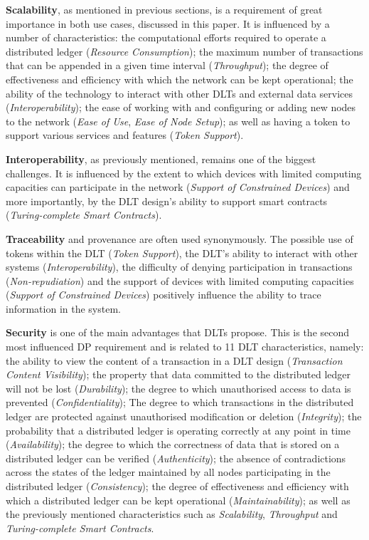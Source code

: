\textbf{Scalability}, as mentioned in previous sections, is a requirement of great importance in both use cases, discussed in this paper. It is influenced by a number of characteristics: the computational efforts required to operate a distributed ledger (\textit{Resource Consumption}); the maximum number of transactions that can be appended in a given time interval (\textit{Throughput}); the degree of effectiveness and efficiency with which the network can be kept operational; the ability of the technology to interact with other DLTs and external data services (\textit{Interoperability}); the ease of working with and configuring or adding new nodes to the network (\textit{Ease of Use}, \textit{Ease of Node Setup}); as well as having a token to support various services and features (\textit{Token Support}).

\textbf{Interoperability}, as previously mentioned, remains one of the biggest challenges. It is influenced by the extent to which devices with limited computing capacities can participate in the network (\textit{Support of Constrained Devices}) and more importantly, by the DLT design's ability to support smart contracts (\textit{Turing-complete Smart Contracts}).

\textbf{Traceability} and provenance are often used synonymously. The possible use of tokens within the DLT (\textit{Token Support}), the DLT's ability to interact with other systems (\textit{Interoperability}), the difficulty of denying participation in transactions (\textit{Non-repudiation}) and the support of devices with limited computing capacities (\textit{Support of Constrained Devices}) positively influence the ability to trace information in the system.

\textbf{Security} is one of the main advantages that DLTs propose. This is the second most influenced DP requirement and is related to 11 DLT characteristics, namely: the ability to view the content of a transaction in a DLT design (\textit{Transaction Content Visibility}); the property that data committed to the distributed ledger will not be lost (\textit{Durability}); the degree to which unauthorised access to data is prevented (\textit{Confidentiality}); The degree to which transactions in the distributed ledger are protected against unauthorised modification or deletion (\textit{Integrity}); the probability that a distributed ledger is operating correctly at any point in time (\textit{Availability}); the degree to which the correctness of data that is stored on a distributed ledger can be verified (\textit{Authenticity}); the absence of contradictions across the states of the ledger maintained by all nodes participating in the distributed ledger (\textit{Consistency}); the degree of effectiveness and efficiency with which a distributed ledger can be kept operational (\textit{Maintainability}); as well as the previously mentioned characteristics such as \textit{Scalability}, \textit{Throughput} and \textit{Turing-complete Smart Contracts}.

